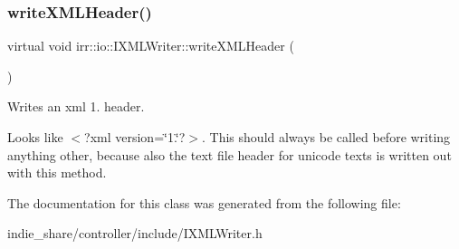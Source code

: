 \subsubsection{\texorpdfstring{write\+X\+M\+L\+Header()}{writeXMLHeader()}}
{\footnotesize\ttfamily virtual void irr\+::io\+::\+I\+X\+M\+L\+Writer\+::write\+X\+M\+L\+Header (\begin{DoxyParamCaption}{ }\end{DoxyParamCaption})\hspace{0.3cm}{\ttfamily [pure virtual]}}



Writes an xml 1. header. 

Looks like $<$?xml version=\char`\"{}1.\char`\"{}?$>$. This should always be called before writing anything other, because also the text file header for unicode texts is written out with this method. 

The documentation for this class was generated from the following file\+:\begin{DoxyCompactItemize}
\item 
indie\+\_\+share/controller/include/I\+X\+M\+L\+Writer.\+h\end{DoxyCompactItemize}

